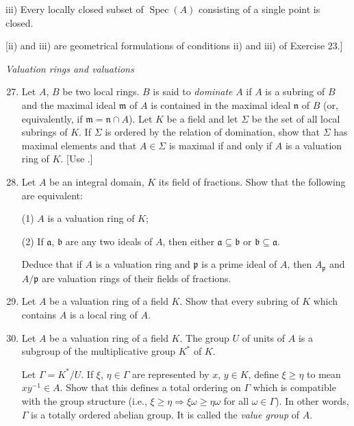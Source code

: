 
iii) Every locally closed subset of $\operatorname{Spec}(A)$ consisting of a single point is closed.

[ii) and iii) are geometrical formulations of conditions ii) and iii) of Exercise 23.]

\noindent\textit{Valuation rings and valuations}

\begin{enumerate}
\setcounter{enumi}{26}
\item Let $A$, $B$ be two local rings. $B$ is said to \textit{dominate} $A$ if $A$ is a subring of $B$ and the maximal ideal $\mathfrak m$ of $A$ is contained in the maximal ideal $\mathfrak n$ of $B$ (or, equivalently, if $\mathfrak m=\mathfrak n\cap A$). Let $K$ be a field and let $\Sigma$ be the set of all local subrings of $K$. If $\Sigma$ is ordered by the relation of domination, show that $\Sigma$ has maximal elements and that $A\in\Sigma$ is maximal if and only if $A$ is a valuation ring of $K$. [Use .]

\item Let $A$ be an integral domain, $K$ its field of fractions. Show that the following are equivalent:

(1) $A$ is a valuation ring of $K$;

(2) If $\mathfrak a$, $\mathfrak b$ are any two ideals of $A$, then either $\mathfrak a\subseteq\mathfrak b$ or $\mathfrak b\subseteq\mathfrak a$.

Deduce that if $A$ is a valuation ring and $\mathfrak p$ is a prime ideal of $A$, then $A_{\mathfrak p}$ and $A/\mathfrak p$ are valuation rings of their fields of fractions.

\item Let $A$ be a valuation ring of a field $K$. Show that every subring of $K$ which contains $A$ is a local ring of $A$.

\item Let $A$ be a valuation ring of a field $K$. The group $U$ of units of $A$ is a subgroup of the multiplicative group $K^*$ of $K$.

Let $\Gamma=K^*/U$. If $\xi$, $\eta\in\Gamma$ are represented by $x$, $y\in K$, define $\xi\geq\eta$ to mean $xy^{-1}\in A$. Show that this defines a total ordering on $\Gamma$ which is compatible with the group structure (i.e., $\xi\geq\eta\Rightarrow\xi\omega\geq\eta\omega$ for all $\omega\in\Gamma$). In other words, $\Gamma$ is a totally ordered abelian group. It is called the \textit{value group} of $A$.


\end{enumerate}
